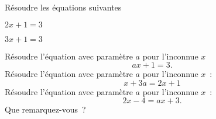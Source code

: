 \documentclass[a4paper,12pt]{article}
\begin{document}
\begin{activite}
	\tcblower
	\begin{tasks}
		\task Résoudre les équations suivantes

		\begin{center}	
		\begin{inlineumerate}
		\item $2x+1=3$\hspace{3cm}
		\item $3x+1=3$
		\end{inlineumerate}
		\end{center}
\task Résoudre l'équation avec paramètre $a$ pour l'inconnue $x$~ 
\[ax+1=3.\]
\vspace{-0.8cm}
\task Résoudre l'équation avec paramètre $a$ pour l'inconnue $x$~: \[x+3a=2x+1\]
\vspace{-0.8cm}
\task Résoudre l'équation avec paramètre $a$ pour l'inconnue $x$~:\[2x-4=ax+3.\]
\vspace{-0.8cm}
\task Que remarquez-vous~?
	\end{tasks}
\end{activite}
\newpage
\end{document}

